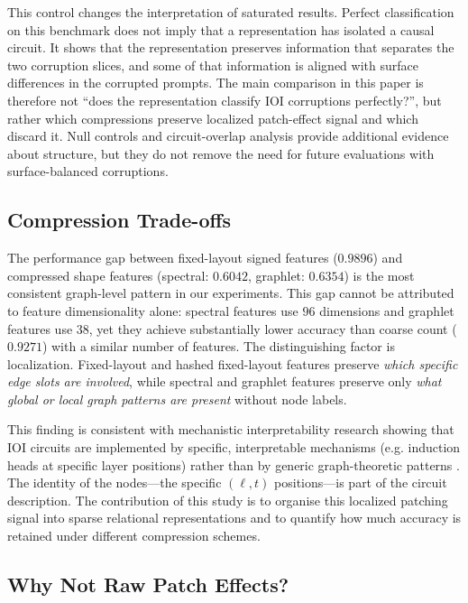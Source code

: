 \documentclass[11pt,a4paper]{article}
\begin{document}
This control changes the interpretation of saturated results. Perfect classification on this benchmark does not imply that a representation has isolated a causal circuit. It shows that the representation preserves information that separates the two corruption slices, and some of that information is aligned with surface differences in the corrupted prompts. The main comparison in this paper is therefore not ``does the representation classify IOI corruptions perfectly?'', but rather which compressions preserve localized patch-effect signal and which discard it. Null controls and circuit-overlap analysis provide additional evidence about structure, but they do not remove the need for future evaluations with surface-balanced corruptions.

\subsection{Compression Trade-offs}

The performance gap between fixed-layout signed features ($0.9896$) and compressed shape features (spectral: $0.6042$, graphlet: $0.6354$) is the most consistent graph-level pattern in our experiments. This gap cannot be attributed to feature dimensionality alone: spectral features use $96$ dimensions and graphlet features use $38$, yet they achieve substantially lower accuracy than coarse count ($0.9271$) with a similar number of features. The distinguishing factor is localization. Fixed-layout and hashed fixed-layout features preserve \emph{which specific edge slots are involved}, while spectral and graphlet features preserve only \emph{what global or local graph patterns are present} without node labels.

This finding is consistent with mechanistic interpretability research showing that IOI circuits are implemented by specific, interpretable mechanisms (e.g. induction heads at specific layer positions) rather than by generic graph-theoretic patterns \cite{wang2023localizing,nanda2023attribution,turpin2023algorithmic}. The identity of the nodes---the specific $(\ell, t)$ positions---is part of the circuit description. The contribution of this study is to organise this localized patching signal into sparse relational representations and to quantify how much accuracy is retained under different compression schemes.

\subsection{Why Not Raw Patch Effects?}
\label{sec:why_not_raw}
\end{document}
